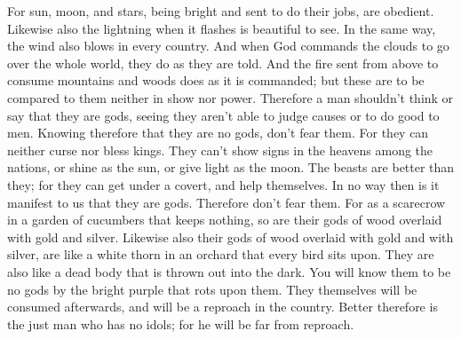  For sun, moon, and stars, being bright and sent to do
their jobs, are obedient.  Likewise also the lightning when
it flashes is beautiful to see. In the same way, the wind also blows in
every country.  And when God commands the clouds to go over
the whole world, they do as they are told.  And the fire
sent from above to consume mountains and woods does as it is commanded;
but these are to be compared to them neither in show nor power.
 Therefore a man shouldn't think or say that they are gods,
seeing they aren't able to judge causes or to do good to men.
 Knowing therefore that they are no gods, don't fear them.
 For they can neither curse nor bless kings. 
They can't show signs in the heavens among the nations, or shine as the
sun, or give light as the moon.  The beasts are better than
they; for they can get under a covert, and help themselves.
 In no way then is it manifest to us that they are gods.
Therefore don't fear them.  For as a scarecrow in a garden
of cucumbers that keeps nothing, so are their gods of wood overlaid with
gold and silver.  Likewise also their gods of wood overlaid
with gold and with silver, are like a white thorn in an orchard that
every bird sits upon. They are also like a dead body that is thrown out
into the dark.  You will know them to be no gods by the
bright purple that rots upon them. They themselves will be consumed
afterwards, and will be a reproach in the country.  Better
therefore is the just man who has no idols; for he will be far from
reproach.
